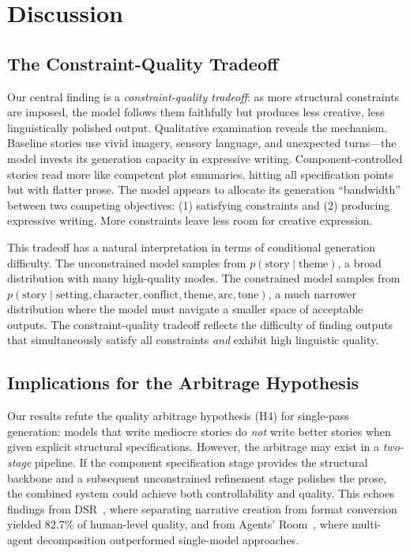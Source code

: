 \section{Discussion}
\label{sec:discussion}

\subsection{The Constraint-Quality Tradeoff}
\label{sec:tradeoff}

Our central finding is a \emph{constraint-quality tradeoff}: as more structural constraints are imposed, the model follows them faithfully but produces less creative, less linguistically polished output.
Qualitative examination reveals the mechanism.
Baseline stories use vivid imagery, sensory language, and unexpected turns---the model invests its generation capacity in expressive writing.
Component-controlled stories read more like competent plot summaries, hitting all specification points but with flatter prose.
The model appears to allocate its generation ``bandwidth'' between two competing objectives: (1) satisfying constraints and (2) producing expressive writing.
More constraints leave less room for creative expression.

This tradeoff has a natural interpretation in terms of conditional generation difficulty.
The unconstrained model samples from $p(\text{story} \mid \text{theme})$, a broad distribution with many high-quality modes.
The constrained model samples from $p(\text{story} \mid \text{setting}, \text{character}, \text{conflict}, \text{theme}, \text{arc}, \text{tone})$, a much narrower distribution where the model must navigate a smaller space of acceptable outputs.
The constraint-quality tradeoff reflects the difficulty of finding outputs that simultaneously satisfy all constraints \emph{and} exhibit high linguistic quality.

\subsection{Implications for the Arbitrage Hypothesis}

Our results refute the quality arbitrage hypothesis (H4) for single-pass generation: models that write mediocre stories do \emph{not} write better stories when given explicit structural specifications.
However, the arbitrage may exist in a \emph{two-stage} pipeline.
If the component specification stage provides the structural backbone and a subsequent unconstrained refinement stage polishes the prose, the combined system could achieve both controllability and quality.
This echoes findings from DSR~\cite{dsr2025}, where separating narrative creation from format conversion yielded 82.7\% of human-level quality, and from Agents' Room~\cite{huot2024agentsroom}, where multi-agent decomposition outperformed single-model approaches.

